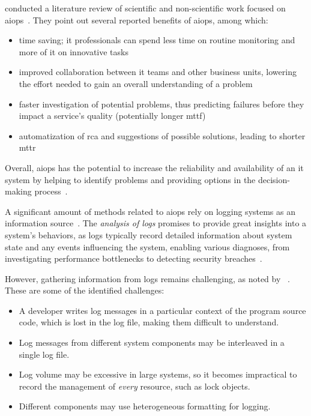 \citeauthor*{aiops_literature_review} conducted a literature review of scientific and non-scientific work focused on \ac{aiops}~\parencite[41-42]{aiops_literature_review}.
They point out several reported benefits of \ac{aiops}, among which:
\begin{itemize}
\item time saving; \ac{it} professionals can spend less time on routine monitoring
      and more of it on innovative tasks
\item improved collaboration between \ac{it} teams and other business units,
      lowering the effort needed to gain an overall understanding of a problem
\item faster investigation of potential problems,
      thus predicting failures before they impact a service's quality (potentially longer \ac{mttf})
\item automatization of \ac{rca} and suggestions of possible solutions, leading to shorter \ac{mttr}
\end{itemize}
Overall, \ac{aiops} has the potential to increase the reliability and availability of an \ac{it} system
by helping to identify problems and
providing options in the decision-making process~\parencite[1]{aiops_levels}.

A significant amount of methods related to \ac{aiops} rely on logging systems as an information source~\parencite[116]{aiops_trends}.
The \emph{analysis of logs} promises to provide great insights into a system's behaviors,
as logs typically record detailed information about system state and any events influencing the system,
enabling various diagnoses, from investigating performance bottlenecks to detecting security breaches~\parencites{log_analysis}[1]{logpai_logparser_benchmarks}.

However, gathering information from logs remains challenging, as noted by \citeauthor*{log_analysis}~\parencite{log_analysis}.
These are some of the identified challenges:
\begin{itemize}
\item A developer writes log messages in a particular context of the program source code,
      which is lost in the log file, making them difficult to understand.
\item Log messages from different system components may be interleaved in a single log file.
\item Log volume may be excessive in large systems,
      so it becomes impractical to record the management of \emph{every} resource, such as lock objects.
\item Different components may use heterogeneous formatting for logging.
\end{itemize}

